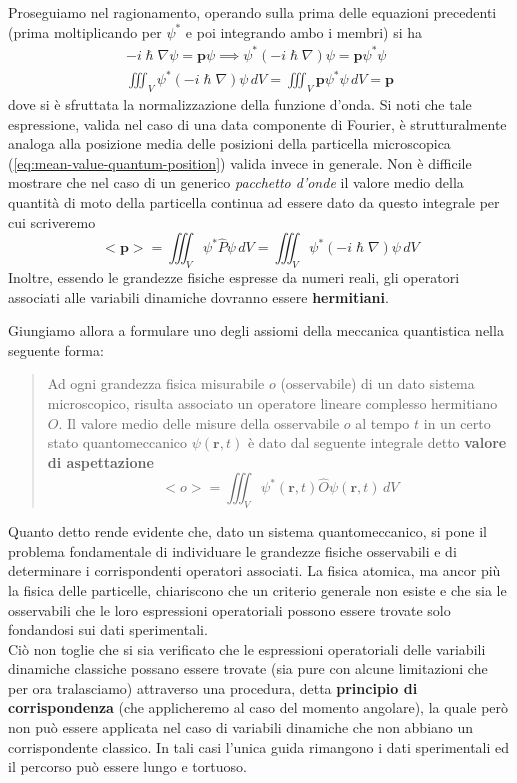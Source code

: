 Proseguiamo nel ragionamento, operando sulla prima delle equazioni
precedenti (prima moltiplicando per \(\psi^{*}\) e poi integrando ambo i
membri) si ha
\begin{gather*}
	- i \hslash \nabla \psi = \bm{p} \psi \implies
	\psi^{*}(-i \hslash \nabla) \psi = \bm{p} \psi^{*}\psi\\
	\iiint_{V} \psi^{*}(-i \hslash \nabla) \psi \, dV = \iiint_{V} \bm{p} \psi^{*}\psi \, dV = \bm{p}
\end{gather*} dove si è sfruttata la normalizzazione della funzione d'onda.
Si noti
che tale espressione, valida nel caso di una data componente di Fourier,
è strutturalmente analoga alla posizione media delle posizioni della
particella microscopica (\ref{eq:mean-value-quantum-position}) valida invece in generale.
Non è difficile mostrare che nel caso di un generico \emph{pacchetto d'onde} il
valore medio della quantità di moto della particella continua ad essere
dato da questo integrale per cui scriveremo
\[
	<\bm{p}> = \iiint_{V} \psi^{*}\hat{P}\psi \, dV = \iiint_{V} \psi^{*}(- i \hslash \nabla )\psi \, dV
\] Inoltre, essendo le grandezze fisiche espresse da numeri reali, gli
operatori associati alle variabili dinamiche dovranno essere
\textbf{hermitiani}.

Giungiamo allora a formulare uno degli assiomi della meccanica
quantistica nella seguente forma:

\begin{quote}
	Ad ogni grandezza fisica misurabile \(o\) (osservabile) di un dato
	sistema microscopico, risulta associato un operatore lineare complesso
	hermitiano \(O\).
	Il valore medio delle misure della osservabile \(o\)
	al tempo \(t\) in un certo stato quantomeccanico \(\psi(\bm{r},t)\) è
	dato dal seguente integrale detto \textbf{valore di aspettazione}
	\begin{equation}
		\boxed{<o> = \iiint_{V} \psi^{*}(\bm{r},t)\hat{O}\psi(\bm{r},t) \, dV}
         \label{eq:observable-qm-axiom}
	\end{equation}
\end{quote}

Quanto detto rende evidente che, dato un sistema quantomeccanico, si
pone il problema fondamentale di individuare le grandezze fisiche
osservabili e di determinare i corrispondenti operatori associati.
La
fisica atomica, ma ancor più la fisica delle particelle, chiariscono che
un criterio generale non esiste e che sia le osservabili che le loro
espressioni operatoriali possono essere trovate solo fondandosi sui dati
sperimentali.\\
Ciò non toglie che si sia verificato che le espressioni operatoriali
delle variabili dinamiche classiche possano essere trovate (sia pure con
alcune limitazioni che per ora tralasciamo) attraverso una procedura,
detta \textbf{principio di corrispondenza} (che applicheremo al caso del
momento angolare), la quale però non può essere applicata nel caso di
variabili dinamiche che non abbiano un corrispondente classico.
In tali
casi l'unica guida rimangono i dati sperimentali ed il percorso può
essere lungo e tortuoso.

